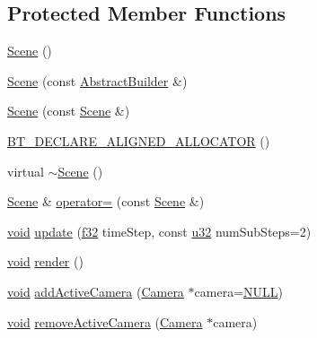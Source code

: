 \subsection*{Protected Member Functions}
\begin{DoxyCompactItemize}
\item 
\mbox{\hyperlink{classnjli_1_1_scene_af5b5f627027c8c24f6a9eb27c1cb1dbf}{Scene}} ()
\item 
\mbox{\hyperlink{classnjli_1_1_scene_ab7db7cebb1627f136ea6831bb455a073}{Scene}} (const \mbox{\hyperlink{classnjli_1_1_abstract_builder}{Abstract\+Builder}} \&)
\item 
\mbox{\hyperlink{classnjli_1_1_scene_a833d4549a6020037969b44d7dc766027}{Scene}} (const \mbox{\hyperlink{classnjli_1_1_scene}{Scene}} \&)
\item 
\mbox{\hyperlink{classnjli_1_1_scene_a04e4c63725b6fc0df8581eb71231d18d}{B\+T\+\_\+\+D\+E\+C\+L\+A\+R\+E\+\_\+\+A\+L\+I\+G\+N\+E\+D\+\_\+\+A\+L\+L\+O\+C\+A\+T\+OR}} ()
\item 
virtual \mbox{\hyperlink{classnjli_1_1_scene_aff30fbf404fd4112c54759d33960d78f}{$\sim$\+Scene}} ()
\item 
\mbox{\hyperlink{classnjli_1_1_scene}{Scene}} \& \mbox{\hyperlink{classnjli_1_1_scene_a6d9e503fc33bad3dc24f884a72e17d08}{operator=}} (const \mbox{\hyperlink{classnjli_1_1_scene}{Scene}} \&)
\item 
\mbox{\hyperlink{_thread_8h_af1e856da2e658414cb2456cb6f7ebc66}{void}} \mbox{\hyperlink{classnjli_1_1_scene_aad491cfead02896db73ba6271d58a298}{update}} (\mbox{\hyperlink{_util_8h_a5f6906312a689f27d70e9d086649d3fd}{f32}} time\+Step, const \mbox{\hyperlink{_util_8h_a10e94b422ef0c20dcdec20d31a1f5049}{u32}} num\+Sub\+Steps=2)
\item 
\mbox{\hyperlink{_thread_8h_af1e856da2e658414cb2456cb6f7ebc66}{void}} \mbox{\hyperlink{classnjli_1_1_scene_adc510ff6029dca669031a031d9ca0069}{render}} ()
\item 
\mbox{\hyperlink{_thread_8h_af1e856da2e658414cb2456cb6f7ebc66}{void}} \mbox{\hyperlink{classnjli_1_1_scene_a8dadc66e35d70f7d51bceee337aa268d}{add\+Active\+Camera}} (\mbox{\hyperlink{classnjli_1_1_camera}{Camera}} $\ast$camera=\mbox{\hyperlink{_util_8h_a070d2ce7b6bb7e5c05602aa8c308d0c4}{N\+U\+LL}})
\item 
\mbox{\hyperlink{_thread_8h_af1e856da2e658414cb2456cb6f7ebc66}{void}} \mbox{\hyperlink{classnjli_1_1_scene_a27894158aebeba1a3251efa33c41aa71}{remove\+Active\+Camera}} (\mbox{\hyperlink{classnjli_1_1_camera}{Camera}} $\ast$camera)
\item 

\end{DoxyCompactItemize}
